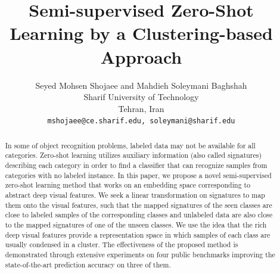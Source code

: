 \documentclass[10pt,twocolumn,letterpaper]{article}
\begin{document}
\title{Semi-supervised Zero-Shot Learning by a Clustering-based Approach}
 \author{Seyed Mohsen Shojaee and Mahdieh Soleymani Baghshah\\
 Sharif University of Technology \\
 Tehran, Iran\\
 {\tt\small mshojaee@ce.sharif.edu, soleymani@sharif.edu}
 }

\maketitle

\begin{abstract}
In some of object recognition problems, labeled data may not be available for all categories.
 Zero-shot learning utilizes auxiliary information (also called signatures)
 describing each category in order to find a classifier that can recognize samples
from categories with no labeled instance. %
In this paper, we propose a novel semi-supervised zero-shot learning method that works on an embedding space corresponding to
abstract deep visual features. We seek a linear transformation on signatures to map them onto the visual features,
such that the mapped signatures of the seen classes are close to labeled samples of the corresponding
classes and unlabeled data are also close to the mapped signatures of one of the unseen classes.
 We use the idea that the rich deep visual features provide a representation
 space in which samples of each class are usually condensed in a cluster. The effectiveness of the proposed method is demonstrated through extensive
experiments on four public benchmarks improving the state-of-the-art prediction accuracy on three of them.
\end{abstract}
\end{document}
